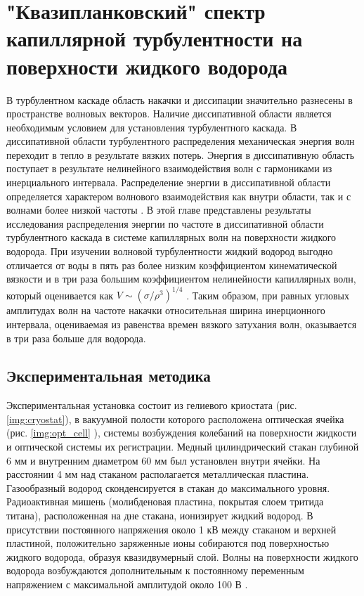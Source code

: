 \chapter{"Квазипланковский" спектр капиллярной турбулентности на поверхности жидкого водорода}


В турбулентном каскаде область накачки и диссипации значительно разнесены в пространстве волновых векторов. Наличие диссипативной области является необходимым условием для установления турбулентного каскада. В диссипативной области турбулентного распределения механическая энергия волн переходит в тепло в результате вязких потерь. Энергия в диссипативную область поступает в результате нелинейного взаимодействия волн с гармониками из инерциального интервала. Распределение энергии в диссипативной области определяется характером волнового взаимодействия как внутри области, так и с волнами более низкой частоты \cite{Ryzhenkova1990}. 
В этой главе представлены результаты исследования распределения энергии по частоте в диссипативной области турбулентного каскада в системе капиллярных волн на поверхности жидкого водорода. При изучении волновой турбулентности жидкий водород выгодно отличается от воды в пять раз более низким коэффициентом кинематической вязкости и в три раза большим коэффициентом нелинейности капиллярных волн, который оценивается как $V \sim (\sigma / \rho^3)^{1/4}$ . Таким образом, при равных угловых амплитудах волн на частоте накачки относительная ширина инерционного интервала, оцениваемая из равенства времен вязкого затухания волн, оказывается в три раза больше для водорода. 

\section{Экспериментальная методика} %
Экспериментальная установка состоит из гелиевого криостата (рис. \ref{img:cryostat}), в вакуумной полости которого расположена оптическая ячейка (рис. \ref{img:opt_cell} ), системы возбуждения колебаний на поверхности жидкости и оптической системы их регистрации. Медный цилиндрический стакан глубиной 6 мм и внутренним диаметром 60 мм был установлен внутри ячейки. На расстоянии 4 мм над стаканом располагается металлическая пластина. Газообразный водород сконденсируется в стакан до максимального уровня. Радиоактивная мишень (молибденовая пластина, покрытая слоем тритида титана), расположенная на дне стакана, ионизирует жидкий водород. В присутствии постоянного напряжения около 1 кВ между стаканом и верхней пластиной, положительно заряженные ионы собираются под поверхностью жидкого водорода, образуя квазидвумерный слой. Волны на поверхности жидкого водорода возбуждаются дополнительным к постоянному переменным напряжением с максимальной амплитудой около 100 В \cite{Brazhnikov_IET}.
 
